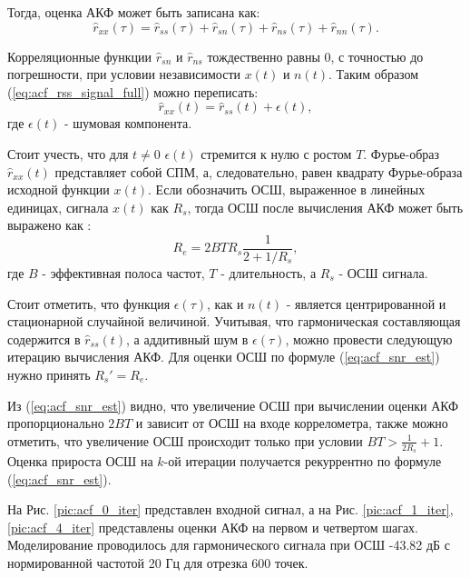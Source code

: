 Тогда, оценка АКФ может быть записана как:
\begin{equation}
	\label{eq:acf_rss_signal_full}
	\hat{r}_{xx}(\tau)=\hat{r}_{ss}(\tau)+\hat{r}_{sn}(\tau)+\hat{r}_{ns}(\tau) + \hat{r}_{nn}(\tau).
\end{equation}

Корреляционные функции ${\hat{r}_{sn}}$ и ${\hat{r}_{ns}}$ тождественно равны 0, с точностью до погрешности, при условии независимости
${x(t)}$ и ${n(t)}$. Таким образом (\ref{eq:acf_rss_signal_full}) можно переписать:
\begin{equation}
	\label{eq:acf_rss_signal_new}
	\hat{r}_{xx}(t) = \hat{r}_{ss}(t) + \epsilon (t),
\end{equation}
где ${\epsilon (t)}$ - шумовая компонента.

Стоит учесть, что для ${t \ne 0}$ ${\epsilon (t)}$ стремится к нулю с ростом ${T}$. Фурье-образ ${\hat{r}_{xx}(t)}$
представляет собой СПМ, а, следовательно, равен квадрату Фурье-образа исходной функции ${x(t)}$.
Если обозначить ОСШ, выраженное в линейных единицах, сигнала ${x(t)}$ как ${R_s}$, тогда ОСШ после вычисления АКФ может быть выражено 
как \cite{book_max}:
\begin{equation}
	\label{eq:acf_snr_est}
	R_e=2BTR_s \frac{1}{2+1/R_s},
\end{equation}
где ${B}$ - эффективная полоса частот, ${T}$ - длительность, а ${R_s}$ - ОСШ сигнала.

Стоит отметить, что функция ${\epsilon(\tau)}$, как и ${n(t)}$ - является центрированной и
стационарной случайной величиной.
Учитывая, что гармоническая составляющая содержится в ${\hat{r}_{ss}(t)}$, а аддитивный шум в ${\epsilon(\tau)}$, можно провести
следующую итерацию вычисления АКФ. Для оценки ОСШ по формуле (\ref{eq:acf_snr_est}) нужно принять ${R_s' = R_e}$.

Из (\ref{eq:acf_snr_est}) видно, что увеличение ОСШ при вычислении оценки АКФ пропорционально ${2BT}$ и зависит от
ОСШ на входе коррелометра, также можно отметить, что увеличение ОСШ происходит только при условии ${BT > \frac{1}{2R_s} + 1}$.
Оценка прироста ОСШ на ${k}$-ой итерации получается рекуррентно по формуле (\ref{eq:acf_snr_est}).

На Рис. \ref{pic:acf_0_iter} представлен входной сигнал, а на
Рис. \ref{pic:acf_1_iter}, \ref{pic:acf_4_iter} представлены оценки АКФ на первом и четвертом шагах.
Моделирование проводилось для гармонического сигнала при ОСШ -43.82 дБ с нормированной частотой 20 Гц для
отрезка 600 точек.

